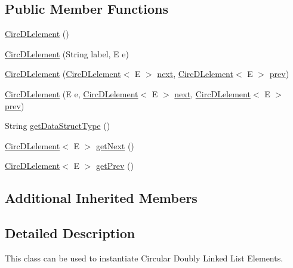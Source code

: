\subsection*{Public Member Functions}
\begin{DoxyCompactItemize}
\item 
\hyperlink{classbridges_1_1base_1_1_circ_d_lelement_ad14ccb772d52c36802c118f2b3f15d59}{Circ\+D\+Lelement} ()
\item 
\hyperlink{classbridges_1_1base_1_1_circ_d_lelement_a84b2ebf47d2ca24077a800b240d8d157}{Circ\+D\+Lelement} (String label, E e)
\item 
\hyperlink{classbridges_1_1base_1_1_circ_d_lelement_a98a471fc3225ed80595e1ffdb377e336}{Circ\+D\+Lelement} (\hyperlink{classbridges_1_1base_1_1_circ_d_lelement}{Circ\+D\+Lelement}$<$ E $>$ \hyperlink{classbridges_1_1base_1_1_s_lelement_abf61c96a74ad319d561c6952ea388e0e}{next}, \hyperlink{classbridges_1_1base_1_1_circ_d_lelement}{Circ\+D\+Lelement}$<$ E $>$ \hyperlink{classbridges_1_1base_1_1_d_lelement_a6eba4876f820b75ac6bde01d7dea9da7}{prev})
\item 
\hyperlink{classbridges_1_1base_1_1_circ_d_lelement_a86e04c826251be9a1a92c4649844e5e7}{Circ\+D\+Lelement} (E e, \hyperlink{classbridges_1_1base_1_1_circ_d_lelement}{Circ\+D\+Lelement}$<$ E $>$ \hyperlink{classbridges_1_1base_1_1_s_lelement_abf61c96a74ad319d561c6952ea388e0e}{next}, \hyperlink{classbridges_1_1base_1_1_circ_d_lelement}{Circ\+D\+Lelement}$<$ E $>$ \hyperlink{classbridges_1_1base_1_1_d_lelement_a6eba4876f820b75ac6bde01d7dea9da7}{prev})
\item 
String \hyperlink{classbridges_1_1base_1_1_circ_d_lelement_ab4885ae7517f1dd04874270c1c3eaf44}{get\+Data\+Struct\+Type} ()
\item 
\hyperlink{classbridges_1_1base_1_1_circ_d_lelement}{Circ\+D\+Lelement}$<$ E $>$ \hyperlink{classbridges_1_1base_1_1_circ_d_lelement_a9ace56dde1f4c23e9a8798c045100ee6}{get\+Next} ()
\item 
\hyperlink{classbridges_1_1base_1_1_circ_d_lelement}{Circ\+D\+Lelement}$<$ E $>$ \hyperlink{classbridges_1_1base_1_1_circ_d_lelement_aa2b83017a571694460f77dd31b4188ed}{get\+Prev} ()
\end{DoxyCompactItemize}
\subsection*{Additional Inherited Members}


\subsection{Detailed Description}
This class can be used to instantiate Circular Doubly Linked List Elements. 

